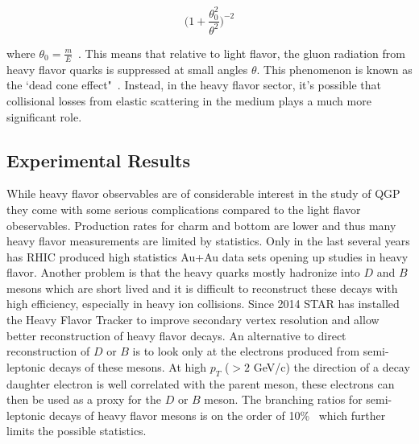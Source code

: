 \begin{equation}\label{eq:deadcone}
\Big( 1 + \frac{\theta^2_0}{\theta^2} \Big)^{-2}
\end{equation}

where $ \theta_0 = \frac{m}{E}$~\cite{glurad}. This means that relative to light flavor, the gluon radiation from heavy flavor quarks is suppressed at small angles $\theta$. This phenomenon is known as the `dead cone effect"~\cite{hqcolor}. Instead, in the heavy flavor sector, it's possible that collisional losses from elastic scattering in the medium plays a much more significant role.

\subsection{Experimental Results}

While heavy flavor observables are of considerable interest in the study of QGP they come with some serious complications compared to the light flavor obeservables. Production rates for charm and bottom are lower and thus many heavy flavor measurements are limited by statistics. Only in the last several years has RHIC produced high statistics Au+Au data sets opening up studies in heavy flavor. Another problem is that the heavy quarks mostly hadronize into $D$ and $B$ mesons which are short lived and it is difficult to reconstruct these decays with high efficiency, especially in heavy ion collisions. Since 2014 STAR has installed the Heavy Flavor Tracker to improve secondary vertex resolution and allow better reconstruction of heavy flavor decays. An alternative to direct reconstruction of $D$ or $B$ is to look only at the electrons produced from semi-leptonic decays of these mesons. At high $p_T$ ($> 2$ GeV/c) the direction of a decay daughter electron is well correlated with the parent meson, these electrons can then be used as a proxy for the $D$ or $B$ meson. The branching ratios for semi-leptonic decays of heavy flavor mesons is on the order of 10\%~\cite{pdg} which further limits the possible statistics.

